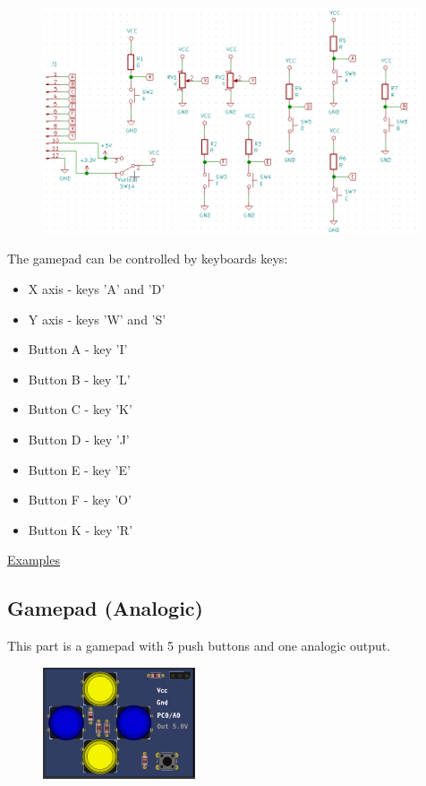 \begin{figure}[H]
\center
\includegraphics[width=0.99\textwidth]{img/part_gamepad_.png} 
\end{figure} 

The gamepad can be controlled by keyboards keys:
\begin{itemize}
 \item X axis - keys 'A' and 'D'
 \item Y axis - keys 'W' and 'S'
 \item Button A - key 'I'
 \item Button B - key 'L'
 \item Button C - key 'K'
 \item Button D - key 'J'
 \item Button E - key 'E'
 \item Button F - key 'O'
 \item Button K - key 'R'
\end{itemize}


\href{https://lcgamboa.github.io/picsimlab_examples/parts_Gamepad.html}{Examples}

\subsection{Gamepad (Analogic)}

This part is a gamepad with 5 push buttons and one analogic output.

\begin{figure}[H]
\center
\includegraphics[width=0.4\textwidth]{img/part_gamepad_an.png} 
\end{figure} 


